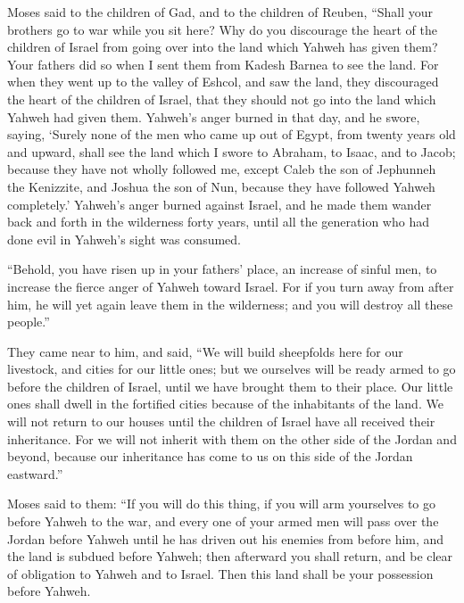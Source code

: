  Moses said to the children of Gad, and to the children of
Reuben, ``Shall your brothers go to war while you sit here?
 Why do you discourage the heart of the children of Israel
from going over into the land which Yahweh has given them?
 Your fathers did so when I sent them from Kadesh Barnea
to see the land.  For when they went up to the valley of
Eshcol, and saw the land, they discouraged the heart of the children of
Israel, that they should not go into the land which Yahweh had given
them.  Yahweh's anger burned in that day, and he swore,
saying,  `Surely none of the men who came up out of
Egypt, from twenty years old and upward, shall see the land which I
swore to Abraham, to Isaac, and to Jacob; because they have not wholly
followed me,  except Caleb the son of Jephunneh the
Kenizzite, and Joshua the son of Nun, because they have followed Yahweh
completely.'  Yahweh's anger burned against Israel, and
he made them wander back and forth in the wilderness forty years, until
all the generation who had done evil in Yahweh's sight was consumed.

 ``Behold, you have risen up in your fathers' place, an
increase of sinful men, to increase the fierce anger of Yahweh toward
Israel.  For if you turn away from after him, he will yet
again leave them in the wilderness; and you will destroy all these
people.''

 They came near to him, and said, ``We will build
sheepfolds here for our livestock, and cities for our little ones;
 but we ourselves will be ready armed to go before the
children of Israel, until we have brought them to their place. Our
little ones shall dwell in the fortified cities because of the
inhabitants of the land.  We will not return to our
houses until the children of Israel have all received their inheritance.
 For we will not inherit with them on the other side of
the Jordan and beyond, because our inheritance has come to us on this
side of the Jordan eastward.''

 Moses said to them: ``If you will do this thing, if you
will arm yourselves to go before Yahweh to the war,  and
every one of your armed men will pass over the Jordan before Yahweh
until he has driven out his enemies from before him,  and
the land is subdued before Yahweh; then afterward you shall return, and
be clear of obligation to Yahweh and to Israel. Then this land shall be
your possession before Yahweh.

